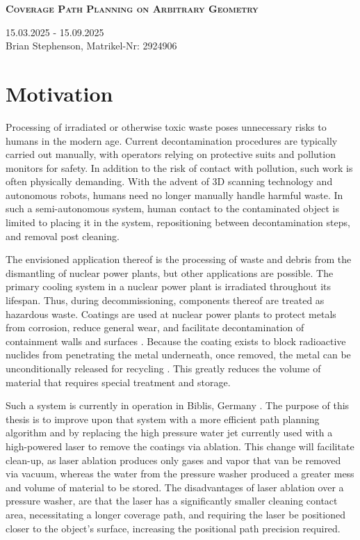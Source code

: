 \documentclass[a4paper, 10pt]{article}
\begin{document}
	
\begin{center}
	\fontsize{24pt}{10pt}\selectfont
	\textsc{\textbf{Coverage Path Planning on Arbitrary Geometry}}
\end{center}
\begin{center}
	15.03.2025 - 15.09.2025 \\
	Brian Stephenson, Matrikel-Nr: 2924906
\end{center}

\section*{Motivation}
Processing of irradiated or otherwise toxic waste poses unnecessary risks to humans in the modern age.
Current decontamination procedures are typically carried out manually, with operators relying on protective suits and pollution monitors for safety.
In addition to the risk of contact with pollution, such work is often physically demanding.
With the advent of 3D scanning technology and autonomous robots, humans need no longer manually handle harmful waste.
In such a semi-autonomous system, human contact to the contaminated object is limited to placing it in the system, repositioning between decontamination steps, and removal post cleaning.

The envisioned application thereof is the processing of waste and debris from the dismantling of nuclear power plants, but other applications are possible.
The primary cooling system in a nuclear power plant is irradiated throughout its lifespan.
Thus, during decommissioning, components thereof are treated as hazardous waste.
Coatings are used at nuclear power plants to protect metals from corrosion, reduce general wear, and facilitate decontamination of containment walls and surfaces \cite{NRC_coatings}.
Because the coating exists to block radioactive nuclides from penetrating the metal underneath, once removed, the metal can be unconditionally released for recycling \cite{NRC_coatings}.
This greatly reduces the volume of material that requires special treatment and storage.

Such a system is currently in operation in Biblis, Germany \cite{ROBBE}.
The purpose of this thesis is to improve upon that system with a more efficient path planning algorithm and by replacing the high pressure water jet currently used with a high-powered laser to remove the coatings via ablation.
This change will facilitate clean-up, as laser ablation produces only gases and vapor that van be removed via vacuum, whereas the water from the pressure washer produced a greater mess and volume of material to be stored.
The disadvantages of laser ablation over a pressure washer, are that the laser has a significantly smaller cleaning contact area, necessitating a longer coverage path, and requiring the laser be positioned closer to the object's surface, increasing the positional path precision required.
\end{document}
